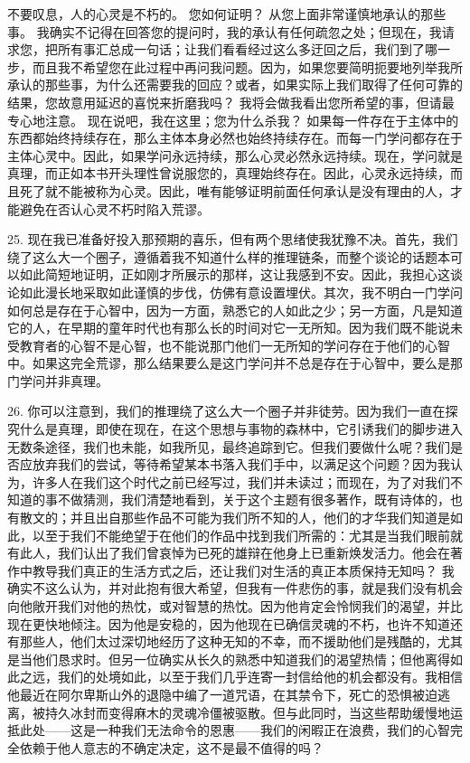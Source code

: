  不要叹息，人的心灵是不朽的。 您如何证明？ 从您上面非常谨慎地承认的那些事。 我确实不记得在回答您的提问时，我的承认有任何疏忽之处；但现在，我请求您，把所有事汇总成一句话；让我们看看经过这么多迂回之后，我们到了哪一步，而且我不希望您在此过程中再问我问题。因为，如果您要简明扼要地列举我所承认的那些事，为什么还需要我的回应？或者，如果实际上我们取得了任何可靠的结果，您故意用延迟的喜悦来折磨我吗？ 我将会做我看出您所希望的事，但请最专心地注意。 现在说吧，我在这里；您为什么杀我？ 如果每一件存在于主体中的东西都始终持续存在，那么主体本身必然也始终持续存在。而每一门学问都存在于主体心灵中。因此，如果学问永远持续，那么心灵必然永远持续。现在，学问就是真理，而正如本书开头理性曾说服您的，真理始终存在。因此，心灵永远持续，而且死了就不能被称为心灵。因此，唯有能够证明前面任何承认是没有理由的人，才能避免在否认心灵不朽时陷入荒谬。\par

25.  现在我已准备好投入那预期的喜乐，但有两个思绪使我犹豫不决。首先，我们绕了这么大一个圈子，遵循着我不知道什么样的推理链条，而整个谈论的话题本可以如此简短地证明，正如刚才所展示的那样，这让我感到不安。因此，我担心这谈论如此漫长地采取如此谨慎的步伐，仿佛有意设置埋伏。其次，我不明白一门学问如何总是存在于心智中，因为一方面，熟悉它的人如此之少；另一方面，凡是知道它的人，在早期的童年时代也有那么长的时间对它一无所知。因为我们既不能说未受教育者的心智不是心智，也不能说那门他们一无所知的学问存在于他们的心智中。如果这完全荒谬，那么结果要么是这门学问并不总是存在于心智中，要么是那门学问并非真理。\par

26.  你可以注意到，我们的推理绕了这么大一个圈子并非徒劳。因为我们一直在探究什么是真理，即使在现在，在这个思想与事物的森林中，它引诱我们的脚步进入无数条途径，我们也未能，如我所见，最终追踪到它。但我们要做什么呢？我们是否应放弃我们的尝试，等待希望某本书落入我们手中，以满足这个问题？因为我认为，许多人在我们这个时代之前已经写过，我们并未读过；而现在，为了对我们不知道的事不做猜测，我们清楚地看到，关于这个主题有很多著作，既有诗体的，也有散文的；并且出自那些作品不可能为我们所不知的人，他们的才华我们知道是如此，以至于我们不能绝望于在他们的作品中找到我们所需的：尤其是当我们眼前就有此人，我们认出了我们曾哀悼为已死的雄辩在他身上已重新焕发活力。他会在著作中教导我们真正的生活方式之后，还让我们对生活的真正本质保持无知吗？ 我确实不这么认为，并对此抱有很大希望，但我有一件悲伤的事，就是我们没有机会向他敞开我们对他的热忱，或对智慧的热忱。因为他肯定会怜悯我们的渴望，并比现在更快地倾注。因为他是安稳的，因为他现在已确信灵魂的不朽，也许不知道还有那些人，他们太过深切地经历了这种无知的不幸，而不援助他们是残酷的，尤其是当他们恳求时。但另一位确实从长久的熟悉中知道我们的渴望热情；但他离得如此之远，我们的处境如此，以至于我们几乎连寄一封信给他的机会都没有。我相信他最近在阿尔卑斯山外的退隐中编了一道咒语，在其禁令下，死亡的恐惧被迫逃离，被持久冰封而变得麻木的灵魂冷僵被驱散。但与此同时，当这些帮助缓慢地运抵此处——这是一种我们无法命令的恩惠——我们的闲暇正在浪费，我们的心智完全依赖于他人意志的不确定决定，这不是最不值得的吗？\par

